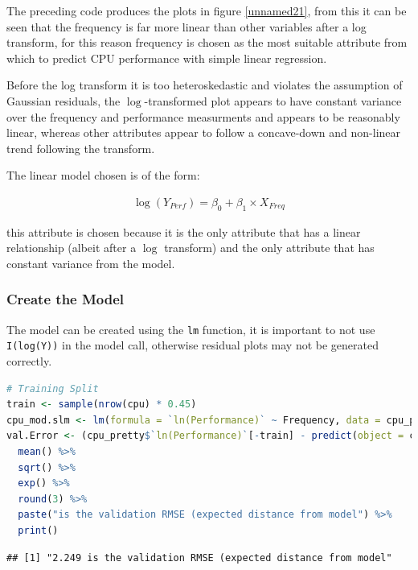 \documentclass[
]{article}
\newcommand{\passthrough}[1]{#1}
\begin{document}
The preceding code produces the plots in figure \ref{unnamed21}, from this it can be seen that the frequency is far more linear than
other variables after a log transform, for this reason frequency is
chosen as the most suitable attribute from which to predict CPU
performance with simple linear regression.

Before the log transform it is too heteroskedastic and violates the
assumption of Gaussian residuals, the $\log$-transformed plot appears to have
constant variance over the frequency and performance measurments and appears to be reasonably linear, whereas other
attributes appear to follow a concave-down and non-linear trend
following the transform.

\newpage

The linear model chosen is of the form:


\begin{align}
\log{\left( Y_{Perf}\right)} = \beta_0 + \beta_1 \times X_{Freq} \label{q1ref}
\end{align}

this attribute is chosen because it is the only attribute that has a
linear relationship (albeit after a $\log$ transform) and the only
attribute that has constant variance from the model.

\hypertarget{create-the-model}{%
\subsubsection{Create the Model}\label{create-the-model}}

The model can be created using the \passthrough{\lstinline!lm!}
function, it is important to not use \passthrough{\lstinline!I(log(Y))!}
in the model call, otherwise residual plots may not be generated correctly.

\begin{lstlisting}[language=R]
# Training Split
train <- sample(nrow(cpu) * 0.45)
cpu_mod.slm <- lm(formula = `ln(Performance)` ~ Frequency, data = cpu_pretty, subset = train)
val.Error <- (cpu_pretty$`ln(Performance)`[-train] - predict(object = cpu_mod.slm, newdata = cpu_pretty[-train,]))^2 %>%
  mean() %>% 
  sqrt() %>% 
  exp() %>% 
  round(3) %>% 
  paste("is the validation RMSE (expected distance from model") %>% 
  print()
\end{lstlisting}

\begin{lstlisting}
## [1] "2.249 is the validation RMSE (expected distance from model"
\end{lstlisting}
\end{document}
